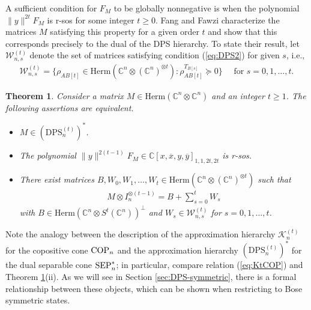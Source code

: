 \documentclass[11pt]{article}
\newcommand{\C}{\ensuremath{\mathbb{C}}} %
\newcommand{\MV}{{\mathcal V}}
\newcommand{\MW}{{\mathcal W}}
\newcommand{\MK}{{\mathcal K}}
\newcommand{\Herm}{\mathrm{Herm}}
\newcommand{\Cnn}{\C^n\ot \C^n}
\newcommand{\Cnnt}{\C^n\ot (\C^n)^{\ot t}}
\newcommand{\MKt}{\MK^{(t)}}
\newcommand{\SEP}{\text{\rm SEP}}
\newcommand{\COP}{\text{\rm COP}}
\newcommand{\DPSt}{\mathrm{DPS}^{(t)}}
\newcommand{\ot}{\otimes}
\newcommand{\ovx}{\overline x}
\newcommand{\ovy}{\overline y}
\theoremstyle{plain}
\newtheorem{theorem}[satz]{Theorem}
\newcommand{\ML}{\textcolor{blue}}
\begin{document}
  
  A sufficient condition for $F_M$ to be globally nonnegative is when the polynomial
  $\|y\|^{2t} F_M$ is r-sos for some integer $t\ge 0$. Fang and Fawzi \cite{FF-sphere} characterize the matrices $M$ satisfying this property for a given order $t$ and show that this corresponds precisely to the dual of the DPS hierarchy. To state their result,  
let $\MW^{(t)}_{n,s}$ denote the set of matrices satisfying   condition (\ref{eq:DPS2}) for given $s$, i.e.,
    \begin{align}\label{eq:Wst}
  \MW^{(t)}_{n,s}=\{\rho_{AB[t]}\in \Herm(\Cnnt): \rho_{AB[t]}^{T_{B[s]}}\succeq 0\}\quad \text{ for } s=0,1,\ldots,t.
  \end{align}
    
  \begin{theorem}\label{theo:FF}\cite{FF-sphere}
Consider  a matrix $M\in\Herm(\Cnn)$ and an integer $t\ge 1$. The following assertions are equivalent.
  \begin{itemize}
  \item[(i)] $M\in (\DPSt_n)^*$.
  \item[(ii)] The polynomial $\|y\|^{2(t-1)} F_M\in\C[x,\ovx,y,\ovy]_{1,1,2t,2t}$ is r-sos.
  \item[(iii)] There exist matrices $B,W_0,W_1,\ldots,W_t\in\Herm(\Cnnt)$ such that 
  \begin{align*}
M\ot I_n^{\ot (t-1)}= B+\sum_{s=0}^t W_s
\end{align*}
with $B\in \Herm(\C^n\ot S^t(\C^n))^\perp$ and $W_s\in \MW^{(t)}_{n,s}$  for  $s=0,1,\ldots,t$.
  \end{itemize}
  \end{theorem}
  
  Note the analogy between the description of the approximation hierarchy $\MKt_n$  for the copositive cone $\COP_n$ and the approximation hierarchy $(\DPSt_n)^*$ for the dual separable cone $\SEP_n^*$; in particular, compare relation (\ref{eq:KtCOP}) and Theorem \ref{theo:FF}(ii).
 As we will see in Section \ref{sec:DPS-symmetric}, there is a formal relationship between these objects, which can be shown when restricting to Bose symmetric   states.
  
\end{document}
